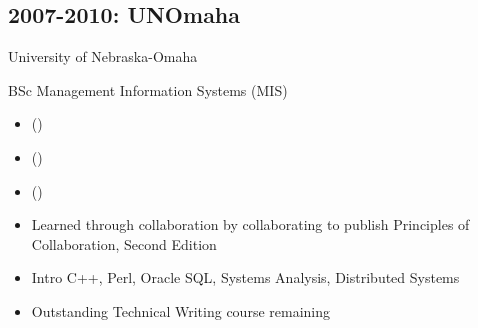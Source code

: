 \documentclass[letter,,openany,oneside,english]{sphinxhowto}
\begin{document}
\subsection{2007-2010: UNOmaha}
\label{\detokenize{resume:unomaha}}
\begin{DUlineblock}{0em}
\item[] University of Nebraska-Omaha
\item[] BSc Management Information Systems (MIS)
\end{DUlineblock}
\begin{itemize}
\item {} 
{\hyperref[\detokenize{resume:uno-misso-president}]{}} ()

\item {} 
{\hyperref[\detokenize{resume:ais-student-chapters-representative}]{}} ()

\item {} 
{\hyperref[\detokenize{resume:id2}]{}} ()

\item {} 
Learned through collaboration by collaborating to publish
Principles of Collaboration, Second Edition

\item {} 
Intro C++, Perl, Oracle SQL, Systems Analysis, Distributed Systems

\item {} 
Outstanding Technical Writing course remaining

\end{itemize}
\label{\detokenize{resume:uno-misso-president}}\label{\detokenize{resume:misso-president}}\label{\detokenize{resume:ais-student-chapters-representative}}\label{\detokenize{resume:aissc-student-representative}}
\end{document}
